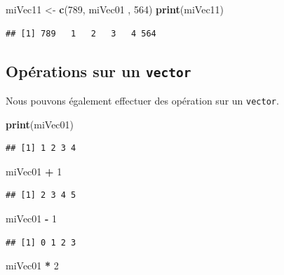 \documentclass[]{book}
\newenvironment{Shaded}{\begin{snugshade}}{\end{snugshade}}
\newcommand{\DecValTok}[1]{\textcolor[rgb]{0.00,0.00,0.81}{#1}}
\newcommand{\KeywordTok}[1]{\textcolor[rgb]{0.13,0.29,0.53}{\textbf{#1}}}
\newcommand{\NormalTok}[1]{#1}
\newcommand{\OperatorTok}[1]{\textcolor[rgb]{0.81,0.36,0.00}{\textbf{#1}}}
\newcommand{\StringTok}[1]{\textcolor[rgb]{0.31,0.60,0.02}{#1}}
\begin{document}
\begin{Shaded}
\begin{Highlighting}[]
\NormalTok{miVec11 <-}\StringTok{ }\KeywordTok{c}\NormalTok{(}\DecValTok{789}\NormalTok{, miVec01 , }\DecValTok{564}\NormalTok{)}
\KeywordTok{print}\NormalTok{(miVec11)}
\end{Highlighting}
\end{Shaded}

\begin{verbatim}
## [1] 789   1   2   3   4 564
\end{verbatim}

\hypertarget{operations-sur-un-vector}{%
\subsection{\texorpdfstring{Opérations sur un \texttt{vector}}{Opérations sur un vector}}\label{operations-sur-un-vector}}

Nous pouvons également effectuer des opération sur un \texttt{vector}.

\begin{Shaded}
\begin{Highlighting}[]
\KeywordTok{print}\NormalTok{(miVec01)}
\end{Highlighting}
\end{Shaded}

\begin{verbatim}
## [1] 1 2 3 4
\end{verbatim}

\begin{Shaded}
\begin{Highlighting}[]
\NormalTok{miVec01 }\OperatorTok{+}\StringTok{ }\DecValTok{1}
\end{Highlighting}
\end{Shaded}

\begin{verbatim}
## [1] 2 3 4 5
\end{verbatim}

\begin{Shaded}
\begin{Highlighting}[]
\NormalTok{miVec01 }\OperatorTok{-}\StringTok{ }\DecValTok{1}
\end{Highlighting}
\end{Shaded}

\begin{verbatim}
## [1] 0 1 2 3
\end{verbatim}

\begin{Shaded}
\begin{Highlighting}[]
\NormalTok{miVec01 }\OperatorTok{*}\StringTok{ }\DecValTok{2}
\end{Highlighting}
\end{Shaded}
\end{document}
